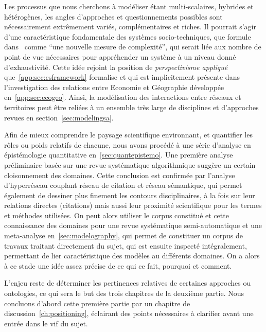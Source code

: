 
Les processus que nous cherchons à modéliser étant multi-scalaires, hybrides et hétérogènes, les angles d'approches et questionnements possibles sont nécessairement extrêmement variés, complémentaires et riches. Il pourrait s'agir d'une caractéristique fondamentale des systèmes socio-techniques, que  formule dans~\cite{pumain2005cumulativite} comme ``une nouvelle mesure de complexité'', qui serait liée aux nombre de point de vue nécessaires pour appréhender un système à un niveau donné d'exhaustivité. Cette idée rejoint la position de \emph{perspectivisme appliqué} que~\ref{app:sec:csframework} formalise et qui est implicitement présente dans l'investigation des relations entre Economie et Géographie développée en~\ref{app:sec:ecogeo}. Ainsi, la modélisation des interactions entre réseaux et territoires peut être reliées à un ensemble très large de disciplines et d'approches revues en section~\ref{sec:modelingsa}.

Afin de mieux comprendre le paysage scientifique environnant, et quantifier les rôles ou poids relatifs de chacune, nous avons procédé à une série d'analyse en épistémologie quantitative en~\ref{sec:quantepistemo}. Une première analyse préliminaire basée sur une revue systématique algorithmique suggère un certain cloisonnement des domaines. Cette conclusion est confirmée par l'analyse d'hyperréseau couplant réseau de citation et réseau sémantique, qui permet également de dessiner plus finement les contours disciplinaires, à la fois sur leur relations directes (citations) mais aussi leur proximité scientifique pour les termes et méthodes utilisées. On peut alors utiliser le corpus constitué et cette connaissance des domaines pour une revue systématique semi-automatique et une meta-analyse en~\ref{sec:modelography}, qui permet de constituer un corpus de travaux traitant directement du sujet, qui est ensuite inspecté intégralement, permettant de lier caractéristique des modèles au différents domaines. On a alors à ce stade une idée assez précise de ce qui ce fait, pourquoi et comment.


L'enjeu reste de déterminer les pertinences relatives de certaines approches ou ontologies, ce qui sera le but des trois chapitres de la deuxième partie. Nous concluons d'abord cette première partie par un chapitre de discussion~\ref{ch:positioning}, éclairant des points nécessaires à clarifier avant une entrée dans le vif du sujet.






\stars
